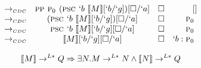 \begin{Proof}
\[\begin{array}{lcrr}
  \tocdc\     & \pp \gp (\psc `b\ \tr{M}[`b/`g])[\square/`a]     & \square & []        \\
  \tocdc\     & (\psc `b\ \tr{M}[`b/`g])[\square/`a]             & \square & \gp       \\
  \tocdc\     & \psc `b\ \tr{M}[`b/`g][\square/`a]               & \square & \gp       \\
  \tocdc\     & \tr{M}[`b/`g][\square/`a]                        & \square & `b:\gp \\
\end{array}
\]
\end{Proof}

\begin{theorem}[Completeness of $\tr{`.}$]
\[
  \llbracket M \rrbracket \to^{L*} Q \Rightarrow \exists N. M \to^{L*} N \land \llbracket N \rrbracket \to^{L*} Q
\]
\end{theorem}
